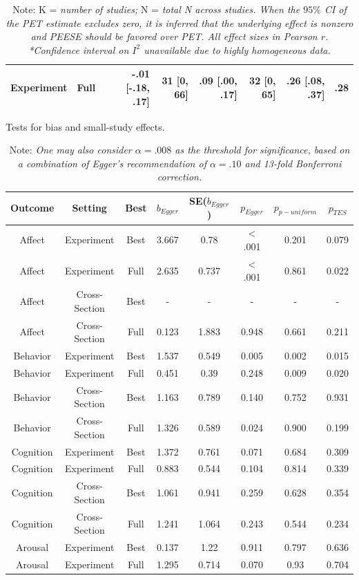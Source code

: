 \documentclass[man, mask]{apa6}
\begin{document}
\begin{table}[htbp]
\begin{tabular}{rrrrrrrr}
	    	Experiment & Full  & -.01 [-.18, .17] & 31 [0, 66] & .09 [.00, .17] & 32 [0, 65] & .26 [.08, .37] & .28 \\
	    	\bottomrule
	    \end{tabular}%
	\label{table:adjustment}%
	\caption*{Note: K = {\em number of studies;} N = {\em total N across studies. When the $95\%$ CI of the PET estimate excludes zero, it is inferred that the underlying effect is nonzero and PEESE should be favored over PET. All effect sizes in Pearson $r$. *Confidence interval on $I^2$ unavailable due to highly homogeneous data.}}
\end{table}%

\begin{table}[htbp]
	\centering
	\caption{Tests for bias and small-study effects.}
	\begin{tabular}{cccccccc}
		\toprule
		Outcome & Setting & Best  & $b_{Egger}$ & SE($b_{Egger}$) & $p_{Egger}$ & $p_{p-uniform}$ & $p_{TES}$ \\
		\midrule
		Affect & Experiment & Best  & 3.667 & 0.78  & < .001 & 0.201 & 0.079 \\
		Affect & Experiment & Full  & 2.635 & 0.737 & < .001 & 0.861 & 0.022 \\
		Affect & Cross-Section & Best  & -     & -     & -     & -     & - \\
		Affect & Cross-Section & Full  & 0.123 & 1.883 & 0.948 & 0.661 & 0.211 \\
		Behavior & Experiment & Best  & 1.537 & 0.549 & 0.005 & 0.002 & 0.015 \\
		Behavior & Experiment & Full  & 0.451 & 0.39  & 0.248 & 0.009 & 0.020 \\
		Behavior & Cross-Section & Best  & 1.163 & 0.789 & 0.140  & 0.752 & 0.931 \\
		Behavior & Cross-Section & Full  & 1.326 & 0.589 & 0.024 & 0.900   & 0.199 \\
		Cognition & Experiment & Best  & 1.372 & 0.761 & 0.071 & 0.684 & 0.309 \\
		Cognition & Experiment & Full  & 0.883 & 0.544 & 0.104 & 0.814 & 0.339 \\
		Cognition & Cross-Section & Best  & 1.061 & 0.941 & 0.259 & 0.628 & 0.354 \\
		Cognition & Cross-Section & Full  & 1.241 & 1.064 & 0.243 & 0.544 & 0.234 \\
		Arousal & Experiment & Best  & 0.137 & 1.22  & 0.911 & 0.797 & 0.636 \\
		Arousal & Experiment & Full  & 1.295 & 0.714 & 0.070  & 0.93  & 0.704 \\
		\bottomrule
	\end{tabular}%
	\label{table:Egger}%
	\caption*{Note: {\em One may also consider $\alpha = .008$ as the threshold for significance, based on a combination of Egger's recommendation of $\alpha = .10$ and 13-fold Bonferroni correction.}}
\end{table}%
\end{document}
